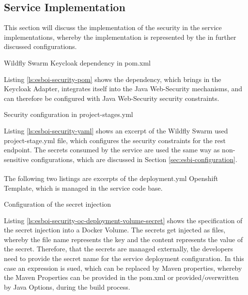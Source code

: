 \subsection{Service Implementation}
\label{sec:esbi-security-service}
This section will discuss the implementation of the security in the service implementations, whereby the implementation is represented by the in further discussed configurations. 

\begin{listing}
	\caption{Wildfly Swarm Keycloak dependency in pom.xml}
	\label{ls:esboi-security-pom}
\end{listing}

Listing \vref{ls:esboi-security-pom} shows the dependency, which brings in the Keycloak Adapter, integrates itself into the Java Web-Security mechanisms, and can therefore be configured with Java Web-Security security constraints.

\begin{listing}
	\caption{Security configuration in project-stages.yml}
	\label{ls:esboi-security-yaml}
\end{listing}

Listing \vref{ls:esboi-security-yaml} shows an excerpt of the Wildfly Swarm used project-stage.yml file, which configures the security constraints for the rest endpoint. The secrets consumed by the service are used the same way as non-sensitive configurations, which are discussed in Section \vref{sec:esbi-configuration}.
\\ \\
The following two listings are excerpts of the deployment.yml Openshift Template, which is managed in the service code base.

\begin{listing}
	\caption{Configuration of the secret injection}
	\label{ls:esboi-security-oc-deployment-volume-secret}
\end{listing}

Listing \vref{ls:esboi-security-oc-deployment-volume-secret} shows the specification of the secret injection into a Docker Volume. The secrets get injected as files, whereby the file name represents the key and the content represents the value of the secret. Therefore, that the secrets are managed externally, the developers need to provide the secret name for the service deployment configuration. In this case an expression is sued, which can be replaced by Maven properties, whereby the Maven Properties can be provided in the pom.xml or provided/overwritten by Java Options, during the build process.

